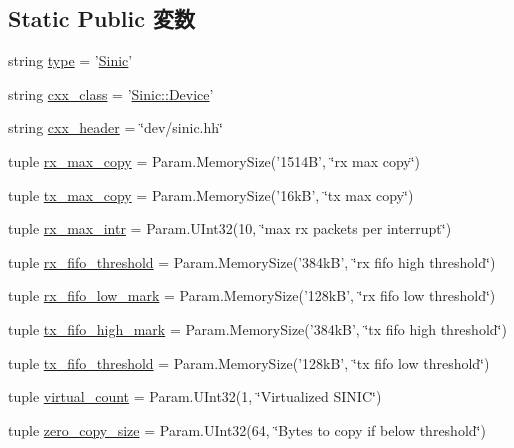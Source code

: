 \subsection*{Static Public 変数}
\begin{DoxyCompactItemize}
\item 
string \hyperlink{classEthernet_1_1Sinic_acce15679d830831b0bbe8ebc2a60b2ca}{type} = '\hyperlink{classEthernet_1_1Sinic}{Sinic}'
\item 
string \hyperlink{classEthernet_1_1Sinic_a58cd55cd4023648e138237cfc0822ae3}{cxx\_\-class} = '\hyperlink{classSinic_1_1Device}{Sinic::Device}'
\item 
string \hyperlink{classEthernet_1_1Sinic_a17da7064bc5c518791f0c891eff05fda}{cxx\_\-header} = \char`\"{}dev/sinic.hh\char`\"{}
\item 
tuple \hyperlink{classEthernet_1_1Sinic_ab20f207dc9ec8ac2c424b651a3db2d22}{rx\_\-max\_\-copy} = Param.MemorySize('1514B', \char`\"{}rx max copy\char`\"{})
\item 
tuple \hyperlink{classEthernet_1_1Sinic_a1a3bd8e55fed98a10a011cdea6330791}{tx\_\-max\_\-copy} = Param.MemorySize('16kB', \char`\"{}tx max copy\char`\"{})
\item 
tuple \hyperlink{classEthernet_1_1Sinic_aff1ea6b2b9961b9f27e19278447c704a}{rx\_\-max\_\-intr} = Param.UInt32(10, \char`\"{}max rx packets per interrupt\char`\"{})
\item 
tuple \hyperlink{classEthernet_1_1Sinic_a23dbf25bafd73410ce88b10151d564cb}{rx\_\-fifo\_\-threshold} = Param.MemorySize('384kB', \char`\"{}rx fifo high threshold\char`\"{})
\item 
tuple \hyperlink{classEthernet_1_1Sinic_ad5c33d5cf217b74a898883107ce39b38}{rx\_\-fifo\_\-low\_\-mark} = Param.MemorySize('128kB', \char`\"{}rx fifo low threshold\char`\"{})
\item 
tuple \hyperlink{classEthernet_1_1Sinic_afcd427b303218cd7a7e43fe6b721ac69}{tx\_\-fifo\_\-high\_\-mark} = Param.MemorySize('384kB', \char`\"{}tx fifo high threshold\char`\"{})
\item 
tuple \hyperlink{classEthernet_1_1Sinic_a26d7dec83b183d15b11a068689e42480}{tx\_\-fifo\_\-threshold} = Param.MemorySize('128kB', \char`\"{}tx fifo low threshold\char`\"{})
\item 
tuple \hyperlink{classEthernet_1_1Sinic_adda52369cba61872fdec92c0f5eee1b9}{virtual\_\-count} = Param.UInt32(1, \char`\"{}Virtualized SINIC\char`\"{})
\item 
tuple \hyperlink{classEthernet_1_1Sinic_a6ea4482b3ba329599bd228765ef1b94a}{zero\_\-copy\_\-size} = Param.UInt32(64, \char`\"{}Bytes to copy if below threshold\char`\"{})

\end{DoxyCompactItemize}
